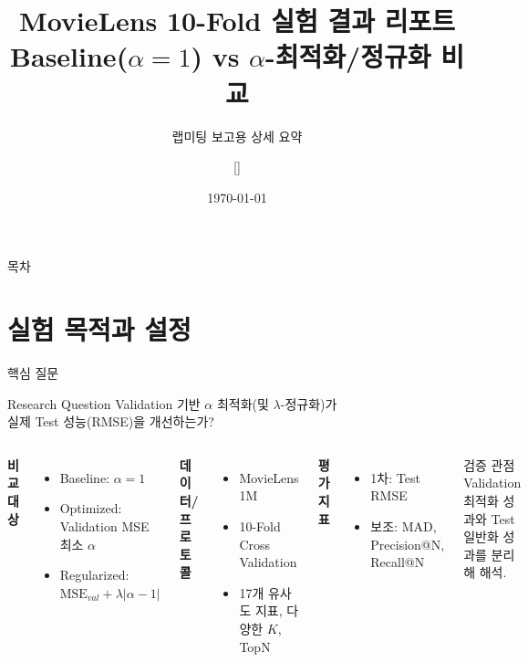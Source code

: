 \documentclass[aspectratio=169,10pt]{beamer}
\title[MovieLens 10-Fold Report]{MovieLens 10-Fold 실험 결과 리포트\\
			 \small Baseline(\(\alpha=1\)) vs \(\alpha\)-최적화/정규화 비교}
\subtitle{랩미팅 보고용 상세 요약}
\author[발표자]{[]}
\institute{[]}
\date{\today}
\begin{document}
\begin{frame}
	\titlepage
\end{frame}

\begin{frame}{목차}
	\tableofcontents[hideallsubsections]
\end{frame}

\section{실험 목적과 설정}

\begin{frame}{핵심 질문}
	\begin{block}{Research Question}
		Validation 기반 \(\alpha\) 최적화(및 \(\lambda\)-정규화)가\\
		실제 Test 성능(RMSE)을 개선하는가?
	\end{block}

	\vspace{0.4em}
	\begin{columns}[T]
			\textbf{비교 대상}
			\begin{itemize}
				\item Baseline: \(\alpha = 1\)
				\item Optimized: Validation MSE 최소 \(\alpha\)
				\item Regularized: \(\text{MSE}_{val}+\lambda|\alpha-1|\)
			\end{itemize}

			\textbf{데이터/프로토콜}
			\begin{itemize}
				\item MovieLens 1M
				\item 10-Fold Cross Validation
				\item 17개 유사도 지표, 다양한 \(K\), TopN
			\end{itemize}

			\textbf{평가 지표}
			\begin{itemize}
				\item 1차: Test RMSE
				\item 보조: MAD, Precision@N, Recall@N
			\end{itemize}

			\vspace{0.4em}
			\begin{alertblock}{검증 관점}
				Validation 최적화 성과와 Test 일반화 성과를 분리해 해석.
			\end{alertblock}
	\end{columns}
\end{frame}
\end{document}
